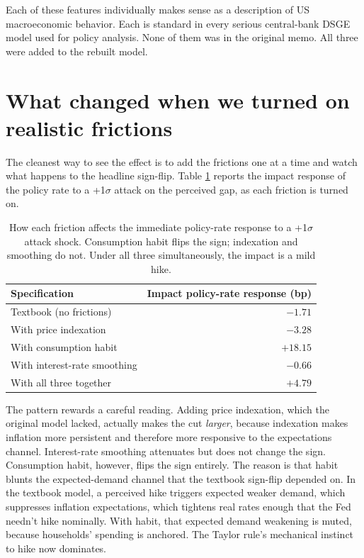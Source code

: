 \documentclass[12pt]{article}
\begin{document}
Each of these features individually makes sense as a description of US macroeconomic behavior. Each is standard in every serious central-bank DSGE model used for policy analysis. None of them was in the original memo. All three were added to the rebuilt model.

\section{What changed when we turned on realistic frictions}

The cleanest way to see the effect is to add the frictions one at a time and watch what happens to the headline sign-flip. Table \ref{tab:frictions} reports the impact response of the policy rate to a +1\(\sigma\) attack on the perceived gap, as each friction is turned on.

\begin{table}[h]
\centering\small
\begin{tabular}{lr}
\toprule
Specification & Impact policy-rate response (bp) \\
\midrule
Textbook (no frictions)     & $-1.71$ \\
With price indexation       & $-3.28$ \\
With consumption habit      & $+18.15$ \\
With interest-rate smoothing & $-0.66$ \\
With all three together     & $+4.79$ \\
\bottomrule
\end{tabular}
\caption{How each friction affects the immediate policy-rate response to a +1\(\sigma\) attack shock. Consumption habit flips the sign; indexation and smoothing do not. Under all three simultaneously, the impact is a mild hike.}
\label{tab:frictions}
\end{table}

The pattern rewards a careful reading. Adding price indexation, which the original model lacked, actually makes the cut \emph{larger}, because indexation makes inflation more persistent and therefore more responsive to the expectations channel. Interest-rate smoothing attenuates but does not change the sign. Consumption habit, however, flips the sign entirely. The reason is that habit blunts the expected-demand channel that the textbook sign-flip depended on. In the textbook model, a perceived hike triggers expected weaker demand, which suppresses inflation expectations, which tightens real rates enough that the Fed needn't hike nominally. With habit, that expected demand weakening is muted, because households' spending is anchored. The Taylor rule's mechanical instinct to hike now dominates.
\end{document}
